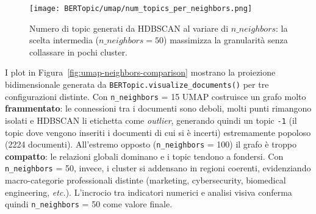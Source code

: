 \begin{table}[H]
\centering
{\setlength{\tabcolsep}{4pt}
}
\caption{Sintesi degli esperimenti al variare di $n\_neighbors$: numero di topic trovati, dimensione media e deviazione standard dei cluster, oltre al conteggio dei topic piccoli ($<100$ documenti), di quelli molto grandi ($>500$ documenti) e al totale di documenti assegnati.}
\label{tab:n-neighbors-summary}
\end{table}

\begin{figure}[H]
\centering
\texttt{[image: BERTopic/umap/num\_topics\_per\_neighbors.png]}
\caption{Numero di topic generati da HDBSCAN al variare di $n\_neighbors$: la scelta intermedia ($n\_neighbors=50$) massimizza la granularità senza collassare in pochi cluster.}
\label{fig:num-topics-per-neighbors}
\end{figure}
\noindent I plot in Figura~\ref{fig:umap-neighbors-comparison} mostrano la proiezione bidimensionale generata da \texttt{BERTopic.\allowbreak visualize\_documents()} per tre configurazioni distinte. Con \texttt{n\_neighbors} = 15 UMAP costruisce un grafo molto \textbf{frammentato}: le connessioni tra i documenti sono deboli, molti punti rimangono isolati e HDBSCAN li etichetta come \textit{outlier}, generando quindi un topic \texttt{-1} (il topic dove vengono inseriti i documenti di cui si è incerti) estremamente popoloso (2224 documenti). All'estremo opposto (\texttt{n\_neighbors} = 100) il grafo è troppo \textbf{compatto}: le relazioni globali dominano e i topic tendono a fondersi. Con \texttt{n\_neighbors} = 50, invece, i cluster si addensano in regioni coerenti, evidenziando macro-categorie professionali distinte (marketing, cybersecurity, biomedical engineering, \emph{etc.}). L'incrocio tra indicatori numerici e analisi visiva conferma quindi \texttt{n\_neighbors} = 50 come valore finale.

